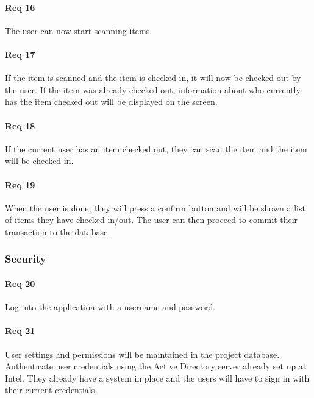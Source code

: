 \documentclass[10pt, onecolumn, twoside, peerreview]{IEEEtran}
\begin{document}
\paragraph*{Req 16} The user can now start scanning items.\\

\paragraph*{Req 17} If the item is scanned and the item is checked in, it will now be checked out by the user. If the item was already
checked out, information about who currently has the item checked out will be displayed on the screen.\\

\paragraph*{Req 18} If the current user has an item checked out, they can scan the item and the item will be checked in.\\

\paragraph*{Req 19} When the user is done, they will press a confirm button and will be shown a list of items they have checked in/out. The
user can then proceed to commit their transaction to the database.\\

\subsubsection{Security}
\paragraph*{Req 20} Log into the application with a username and password.\\

\paragraph*{Req 21} User settings and permissions will be maintained in the project database. Authenticate user credentials using the
Active Directory server already set up at Intel. They already have a system in place and the users will have to sign in
with their current credentials.\\
\end{document}
